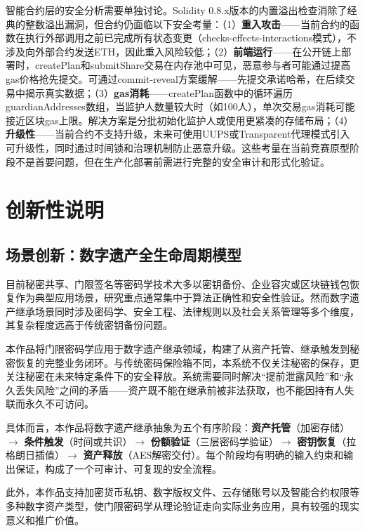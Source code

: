 \documentclass[UTF8,a4paper,zihao=-4,openany]{ctexrep}
\begin{document}
智能合约层的安全分析需要单独讨论。Solidity 0.8.x版本的内置溢出检查消除了经典的整数溢出漏洞，但合约仍面临以下安全考量：（1）\textbf{重入攻击}——当前合约的函数在执行外部调用之前已完成所有状态变更（checks-effects-interactions模式），不涉及向外部合约发送ETH，因此重入风险较低；（2）\textbf{前端运行}——在公开链上部署时，createPlan和submitShare交易在内存池中可见，恶意参与者可能通过提高gas价格抢先提交。可通过commit-reveal方案缓解——先提交承诺哈希，在后续交易中揭示真实数据；（3）\textbf{gas消耗}——createPlan函数中的循环遍历guardianAddresses数组，当监护人数量较大时（如100人），单次交易gas消耗可能接近区块gas上限。解决方案是分批初始化监护人或使用更紧凑的存储布局；（4）\textbf{升级性}——当前合约不支持升级，未来可使用UUPS或Transparent代理模式引入可升级性，同时通过时间锁和治理机制防止恶意升级。这些考量在当前竞赛原型阶段不是首要问题，但在生产化部署前需进行完整的安全审计和形式化验证。

\chapter{创新性说明}

\section{场景创新：数字遗产全生命周期模型}

目前秘密共享、门限签名等密码学技术大多以密钥备份、企业容灾或区块链钱包恢复作为典型应用场景，研究重点通常集中于算法正确性和安全性验证。然而数字遗产继承场景同时涉及密码学、安全工程、法律规则以及社会关系管理等多个维度，其复杂程度远高于传统密钥备份问题。

本作品将门限密码学应用于数字遗产继承领域，构建了从资产托管、继承触发到秘密恢复的完整业务闭环。与传统密码保险箱不同，本系统不仅关注秘密的保存，更关注秘密在未来特定条件下的安全释放。系统需要同时解决“提前泄露风险”和“永久丢失风险”之间的矛盾——资产既不能在继承前被非法获取，也不能因持有人失联而永久不可访问。

具体而言，本作品将数字遗产继承抽象为五个有序阶段：\textbf{资产托管}（加密存储）$\to$ \textbf{条件触发}（时间或共识）$\to$ \textbf{份额验证}（三层密码学验证）$\to$ \textbf{密钥恢复}（拉格朗日插值）$\to$ \textbf{资产释放}（AES解密交付）。每个阶段均有明确的输入约束和输出保证，构成了一个可审计、可复现的安全流程。

此外，本作品支持加密货币私钥、数字版权文件、云存储账号以及智能合约权限等多种数字资产类型，使门限密码学从理论验证走向实际业务应用，具有较强的现实意义和推广价值。
\end{document}
